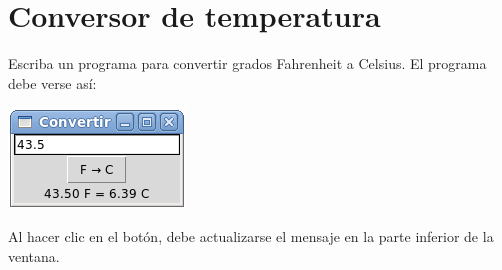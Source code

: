 \section{Conversor de temperatura}

Escriba un programa para convertir grados Fahrenheit a Celsius. El
programa debe verse así:

\includegraphics{../../diapos/programas/tkinter/capturas/08.png}

Al hacer clic en el botón, debe actualizarse el mensaje en la parte
inferior de la ventana.
